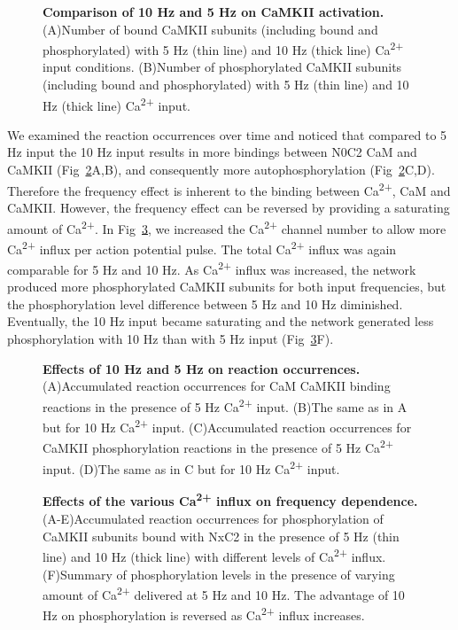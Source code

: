 \documentclass[10pt,letterpaper]{article}
\begin{document}
\begin{figure}[!h]
	\caption{{\bf Comparison of 10 Hz and 5 Hz on CaMKII activation.}
	(A)Number of bound CaMKII subunits (including bound and phosphorylated) with 5 Hz (thin line) and 10 Hz (thick line) Ca\textsuperscript{2+} input conditions.
	(B)Number of phosphorylated CaMKII subunits (including bound and phosphorylated) with 5 Hz (thin line) and 10 Hz (thick line) Ca\textsuperscript{2+} input.
	}
\label{fig6}
\end{figure}

We examined the reaction occurrences over time and noticed that compared to 5 Hz input the 10 Hz input results in more bindings between N0C2 CaM and CaMKII (Fig~\ref{fig7}A,B), and consequently more autophosphorylation (Fig~\ref{fig7}C,D). Therefore the frequency effect is inherent to the binding between Ca\textsuperscript{2+}, CaM and CaMKII. However, the frequency effect can be reversed by providing a saturating amount of Ca\textsuperscript{2+}. In Fig~\ref{fig8}, we increased the Ca\textsuperscript{2+} channel number to allow more Ca\textsuperscript{2+} influx per action potential pulse. The total Ca\textsuperscript{2+} influx was again comparable for 5 Hz and 10 Hz. As Ca\textsuperscript{2+} influx was increased, the network produced more phosphorylated CaMKII subunits for both input frequencies, but the phosphorylation level difference between 5 Hz and 10 Hz diminished. Eventually, the 10 Hz input became saturating and the network generated less phosphorylation with 10 Hz than with 5 Hz input (Fig~\ref{fig8}F).
\begin{figure}[!h]
	\caption{{\bf Effects of 10 Hz and 5 Hz on reaction occurrences.} 
	(A)Accumulated reaction occurrences for CaM CaMKII binding reactions in the presence of 5 Hz Ca\textsuperscript{2+} input. 
	(B)The same as in A but for 10 Hz Ca\textsuperscript{2+} input.
	(C)Accumulated reaction occurrences for CaMKII phosphorylation reactions in the presence of 5 Hz Ca\textsuperscript{2+} input. 
	(D)The same as in C but for 10 Hz Ca\textsuperscript{2+} input.
	}
\label{fig7}
\end{figure}

\begin{figure}[!h]
	\caption{{\bf Effects of the various Ca\textsuperscript{2+} influx on frequency dependence.}
	(A-E)Accumulated reaction occurrences for phosphorylation of CaMKII subunits bound with NxC2 in the presence of 5 Hz (thin line) and 10 Hz (thick line) with different levels of Ca\textsuperscript{2+} influx. 
	(F)Summary of phosphorylation levels in the presence of varying amount of Ca\textsuperscript{2+} delivered at 5 Hz and 10 Hz. The advantage of 10 Hz on phosphorylation is reversed as Ca\textsuperscript{2+} influx increases.
	}
\label{fig8}
\end{figure}
\end{document}
